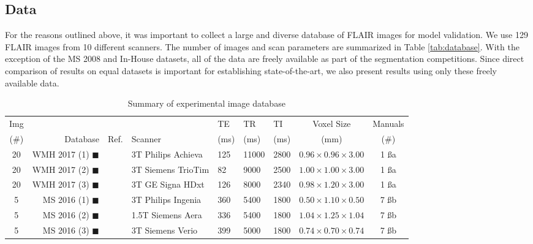\subsection{Data}\label{ss:data}
For the reasons outlined above, it was important to collect a large and diverse database of FLAIR images for model validation. We use 129 FLAIR images from 10 different scanners. The number of images and scan parameters are summarized in Table \ref{tab:database}. With the exception of the MS 2008 and In-House datasets, all of the data are freely available as part of the segmentation competitions. Since direct comparison of results on equal datasets is important for establishing state-of-the-art, we also present results using only these freely available data.
\begin{table}[t]
  \centering
  \caption{Summary of experimental image database}\vspace{0.5em}
  {\setlength{\tabcolsep}{4pt}
    \begin{tabu} to \textwidth {crclX[c]X[c]X[c]cc}
    	\hline
    	Img  &                                          &                   &                    & TE   & TR    & TI   &         Voxel Size         & Manuals  \\
    	(\#) &                                 Database &       Ref.        & Scanner            & (ms) & (ms)  & (ms) &            (mm)            &   (\#)   \\   & WMH 2017 (1) {\color{c01}$\blacksquare$} & \cite{WMHSEG2017} & 3T Philips Achieva & 125  & 11000 & 2800 & $0.96\times0.96\times3.00$ & 1 \ss{a} \\
    	 20  & WMH 2017 (2) {\color{c02}$\blacksquare$} & \cite{WMHSEG2017} & 3T Siemens TrioTim & 82   & 9000  & 2500 & $1.00\times1.00\times3.00$ & 1 \ss{a} \\
    	 20  & WMH 2017 (3) {\color{c03}$\blacksquare$} & \cite{WMHSEG2017} & 3T GE Signa HDxt   & 126  & 8000  & 2340 & $0.98\times1.20\times3.00$ & 1 \ss{a} \\
    	 5   & MS 2016  (1) {\color{c04}$\blacksquare$} & \cite{MSSEG2016}  & 3T Philips Ingenia & 360  & 5400  & 1800 & $0.50\times1.10\times0.50$ & 7 \ss{b} \\
    	 5   & MS 2016  (2) {\color{c05}$\blacksquare$} & \cite{MSSEG2016}  & 1.5T Siemens Aera  & 336  & 5400  & 1800 & $1.04\times1.25\times1.04$ & 7 \ss{b} \\
    	 5   & MS 2016  (3) {\color{c06}$\blacksquare$} & \cite{MSSEG2016}  & 3T Siemens Verio   & 399  & 5000  & 1800 & $0.74\times0.70\times0.74$ & 7 \ss{b} \\

\end{tabu}}
\end{table}
